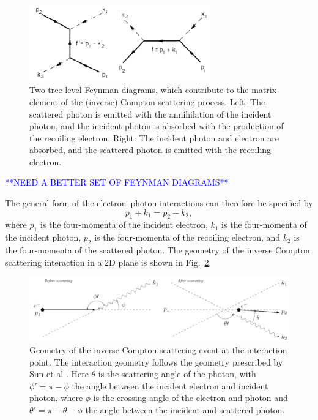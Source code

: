 \documentclass[../main.tex]{subfiles}
\begin{document}
\begin{figure}[!h]
\centering
\includegraphics[width=0.7\textwidth]{Figures/Photon_Production_by_Inverse_Compton_Scattering/Berestetskii_ICS_Feynman.pdf}
\caption{Two tree-level Feynman diagrams, which contribute to the matrix element of the (inverse) Compton scattering process. Left: The scattered photon is emitted with the annihilation of the incident photon, and the incident photon is absorbed with the production of the recoiling electron. Right: The incident photon and electron are absorbed, and the scattered photon is emitted with the recoiling electron. \cite{berestetskii1982quantum}}
\label{fig:ICS_Feynman_diagrams}
\end{figure}
\textcolor{blue}{**NEED A BETTER SET OF FEYNMAN DIAGRAMS**}

The general form of the electron--photon interactions can therefore be specified by
\begin{equation}
p_{1} + k_{1} = p_{2} + k_{2},
\label{eq:ICS_process}
\end{equation}
where $p_{1}$ is the four-momenta of the incident electron, $k_{1}$ is the four-momenta of the incident photon, $p_{2}$ is the four-momenta of the recoiling electron, and $k_{2}$ is the four-momenta of the scattered photon. The geometry of the inverse Compton scattering interaction in a 2D plane is shown in Fig.~\ref{fig:scattered_photon_kinematics}.

\begin{figure}[!h]
\centering
\includegraphics[width=\textwidth]{Figures/Photon_Production_by_Inverse_Compton_Scattering/scatteringkinematicsdiagram.pdf}
\caption{Geometry of the inverse Compton scattering event at the interaction point. The interaction geometry follows the geometry prescribed by Sun et al \cite{sun2009energy}. Here $\theta$ is the scattering angle of the photon, with $\phi' = \pi -\phi$ the angle between the incident electron and incident photon, where $\phi$ is the crossing angle of the electron and photon and $\theta' = \pi - \theta - \phi$ the angle between the incident and scattered photon. }
\label{fig:scattered_photon_kinematics}
\end{figure}
\end{document}
